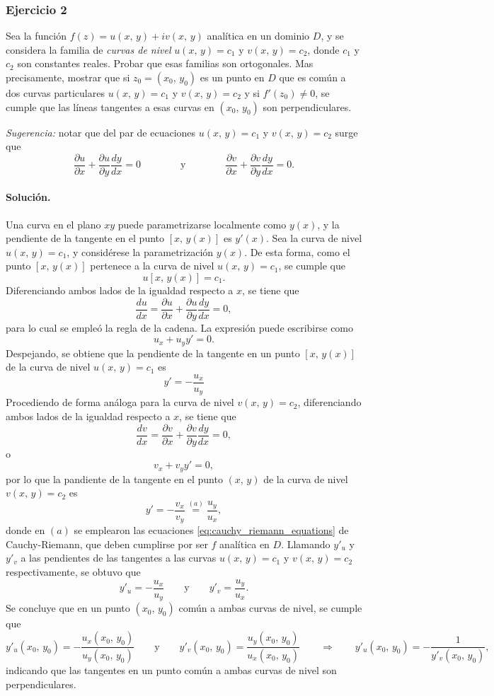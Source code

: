 \documentclass[a4paper]{report}
\begin{document}
\subsubsection{Ejercicio 2}

Sea la función \(f(z)=u(x,\,y)+iv(x,\,y)\) analítica en un dominio \(D\), y se considera la familia de \emph{curvas de nivel} \(u(x,\,y)=c_1\) y \(v(x,\,y)=c_2\), donde \(c_1\) y \(c_2\) son constantes reales. Probar que esas familias son ortogonales. Mas precisamente, mostrar que si \(z_0=(x_0,\,y_0)\) es un punto en \(D\) que es común a dos curvas particulares \(u(x,\,y)=c_1\) y \(v(x,\,y)=c_2\) y si \(f'(z_0)\neq0\), se cumple que las líneas tangentes a esas curvas en \((x_0,\,y_0)\) son perpendiculares. 

\emph{Sugerencia:} notar que del par de ecuaciones \(u(x,\,y)=c_1\) y \(v(x,\,y)=c_2\) surge que
\[
 \frac{\partial u}{\partial x}+\frac{\partial u}{\partial y}\frac{dy}{dx}=0
 \qquad\qquad\textrm{y}\qquad\qquad
 \frac{\partial v}{\partial x}+\frac{\partial v}{\partial y}\frac{dy}{dx}=0.
\]

\paragraph{Solución.} Una curva en el plano \(xy\) puede parametrizarse localmente como \(y(x)\), y la pendiente de la tangente en el punto \([x,\,y(x)]\) es \(y'(x)\). Sea la curva de nivel \(u(x,\,y)=c_1\), y considérese la parametrización \(y(x)\). De esta forma, como el punto \([x,\,y(x)]\) pertenece a la curva de nivel \(u(x,\,y)=c_1\), se cumple que 
\[
 u[x,\,y(x)]=c_1.
\]
Diferenciando ambos lados de la igualdad respecto a \(x\), se tiene que 
\[
 \frac{du}{dx}=\frac{\partial u}{\partial x}+\frac{\partial u}{\partial y}\frac{dy}{dx}=0,
\]
para lo cual se empleó la regla de la cadena. La expresión puede escribirse como
\[
 u_x+u_yy'=0.
\]
Despejando, se obtiene que la pendiente de la tangente en un punto \([x,\,y(x)]\) de la curva de nivel \(u(x,\,y)=c_1\) es
\[
 y'=-\frac{u_x}{u_y}
\]
Procediendo de forma análoga para la curva de nivel \(v(x,\,y)=c_2\), diferenciando ambos lados de la igualdad respecto a \(x\), se tiene que 
\[
 \frac{dv}{dx}=\frac{\partial v}{\partial x}+\frac{\partial v}{\partial y}\frac{dy}{dx}=0,
\]
o
\[
 v_x+v_yy'=0,
\]
por lo que la pandiente de la tangente en el punto \((x,\,y)\) de la curva de nivel \(v(x,\,y)=c_2\) es
\[
 y'=-\frac{v_x}{v_y}\overset{(a)}{=}\frac{u_y}{u_x},
\]
donde en \((a)\) se emplearon las ecuaciones \ref{eq:cauchy_riemann_equations} de Cauchy-Riemann, que deben cumplirse por ser \(f\) analítica en \(D\). Llamando \(y'_u\) y \(y'_v\) a las pendientes de las tangentes a las curvas \(u(x,\,y)=c_1\) y \(v(x,\,y)=c_2\) respectivamente, se obtuvo que 
\[
 y'_u=-\frac{u_x}{u_y}
  \qquad\textrm{y}\qquad
 y'_v=\frac{u_y}{u_x}. 
\]
Se concluye que en un punto \((x_0,\,y_0)\) común a ambas curvas de nivel, se cumple que 
\[
 y'_u(x_0,\,y_0)=-\frac{u_x(x_0,\,y_0)}{u_y(x_0,\,y_0)}
  \qquad\textrm{y}\qquad
 y'_v(x_0,\,y_0)=\frac{u_y(x_0,\,y_0)}{u_x(x_0,\,y_0)}
 \qquad\Rightarrow\qquad 
 y'_u(x_0,\,y_0)=-\frac{1}{y'_v(x_0,\,y_0)},
\]
indicando que las tangentes en un punto común a ambas curvas de nivel son perpendiculares.
\end{document}
